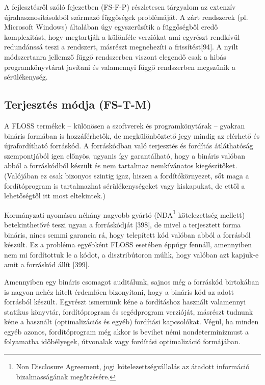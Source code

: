 \documentclass[12pt,magyar,a4paper,oneside]{scrreprt}
\begin{document}
A fejlesztésről szóló fejezetben (FS-F-P) részletesen tárgyalom az
extenzív újrahasznosításokból származó függőségek problémáját. A zárt
rendszerek (pl. Microsoft Windows) általában úgy egyszerűsítik a
függőségből eredő komplexitást, hogy megtartják a különféle verziókat
ami egyrészt rendkívül redundánssá teszi a rendszert, másrészt
megnehezíti a frissítést{[}94{]}. A nyílt módszertanra jellemző függő
rendszerben viszont elegendő csak a hibás programkönyvtárat javítani és
valamennyi függő rendszerben megszűnik a sérülékenység.

\hypertarget{sec:FS-T-M}{%
\subsection{Terjesztés módja (FS-T-M)}\label{sec:FS-T-M}}

A FLOSS termékek -- különösen a szoftverek és programkönytárak --
gyakran bináris formában is hozzáférhetők, de megkülönböztető jegy
mindig az elérhető és újrafordítható forráskód. A forráskódban való
terjesztés és fordítás átláthatóság szempontjából igen előnyös, ugyanis
így garantálható, hogy a bináris valóban abból a forráskódból készült és
nem tartalmaz nemkívánatos kiegészítőket. (Valójában ez csak bizonyos
szintig igaz, hiszen a fordítókörnyezet, sőt maga a fordítóprogram is
tartalmazhat sérülékenységeket vagy kiskapukat, de ettől a lehetőségtől
itt most eltekintek.)

Kormányzati nyomásra néhány nagyobb gyártó (NDA\footnote{Non Disclosure
  Agreement, jogi kötelezettségvállalás az átadott információ
  bizalmasságának megőrzésére.} kötelezettség mellett) betekinthetővé
teszi ugyan a forráskódját {[}398{]}, de mivel a terjesztett forma
bináris, nincs semmi garancia rá, hogy telepített kód valóban abból a
forrásból készült. Ez a probléma egyébként FLOSS esetében éppúgy
fennáll, amennyiben nem mi fordítottuk le a kódot, a disztribútoron
múlik, hogy valóban azt kapjuk-e amit a forráskód állít {[}399{]}.

Amennyiben egy bináris csomagot auditálunk, sajnos még a forráskód
birtokában is nagyon nehéz hitelt érdemlően bizonyítani, hogy a bináris
kód az adott forrásból készült. Egyrészt ismernünk kéne a fordításhoz
használt valamennyi statikus könyvtár, fordítóprogram és segédprogram
verzióját, másrészt tudnunk kéne a használt (optimalizációs és egyéb)
fordítási kapcsolókat. Végül, ha minden egyéb azonos, fordítóprogram még
akkor is bevihet némi nondeterminizmust a folyamatba időbélyegek,
útvonalak vagy fordítási optimalizáció formájában.
\end{document}
